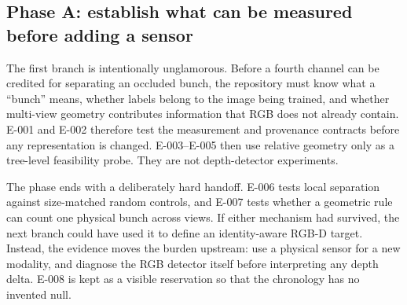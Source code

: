 \subsection{Phase A: establish what can be measured before adding a sensor}
The first branch is intentionally unglamorous. Before a fourth channel can
be credited for separating an occluded bunch, the repository must know what a
``bunch'' means, whether labels belong to the image being trained, and whether
multi-view geometry contributes information that RGB does not already contain.
E-001 and E-002 therefore test the measurement and provenance contracts before
any representation is changed. E-003--E-005 then use relative geometry only as
a tree-level feasibility probe. They are not depth-detector experiments.

The phase ends with a deliberately hard handoff. E-006 tests local separation
against size-matched random controls, and E-007 tests whether a geometric rule
can count one physical bunch across views. If either mechanism had survived,
the next branch could have used it to define an identity-aware RGB-D target.
Instead, the evidence moves the burden upstream: use a physical sensor for a
new modality, and diagnose the RGB detector itself before interpreting any
depth delta. E-008 is kept as a visible reservation so that the chronology has
no invented null.

